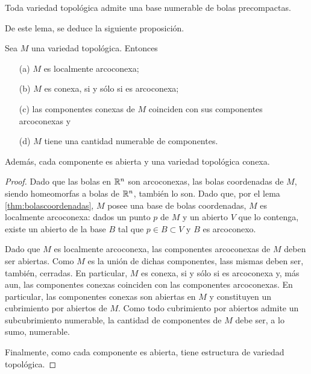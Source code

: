\begin{lemaBolasCoordenadas}
	\label{thm:bolascoordenadas}
	Toda variedad topol\'{o}gica admite una base numerable de bolas
	precompactas.
\end{lemaBolasCoordenadas}

De este lema, se deduce la siguiente proposici\'{o}n.

\begin{propoVariedadesSonLocArco}\label{thm:varssonlocarco}
	Sea $M$ una variedad topol\'{o}gica. Entonces
	\begin{itemize}
		\item[(a)] $M$ es localmente arcoconexa;
		\item[(b)] $M$ es conexa, si y s\'{o}lo si es arcoconexa;
		\item[(c)] las componentes conexas de $M$ coinciden con sus
			componentes arcoconexas y
		\item[(d)] $M$ tiene una cantidad numerable de componentes.
	\end{itemize}
	Adem\'{a}s, cada componente es abierta y una variedad topol\'{o}gica
	conexa.
\end{propoVariedadesSonLocArco}

\begin{proof}
	Dado que las bolas en $\mathbb{R}^{n}$ son arcoconexas, las bolas
	coordenadas de $M$, siendo homeomorfas a bolas de $\mathbb{R}^{n}$,
	tambi\'{e}n lo son. Dado que, por el lema \ref{thm:bolascoordenadas},
	$M$ posee una base de bolas coordenadas, $M$ es localmente arcoconexa:
	dados un punto $p$ de $M$ y un abierto $V$ que lo contenga, existe
	un abierto de la base $B$ tal que $p\in B\subset V$ y $B$ es
	arcoconexo.

	Dado que $M$ es localmente arcoconexa, las componentes arcoconexas
	de $M$ deben ser abiertas. Como $M$ es la uni\'{o}n de dichas
	componentes, lass mismas deben ser, tambi\'{e}n, cerradas. En
	particular, $M$ es conexa, si y s\'{o}lo si es arcoconexa y,
	m\'{a}s aun, las componentes conexas coinciden con las componentes
	arcoconexas. En particular, las componentes conexas son abiertas en
	$M$ y constituyen un cubrimiento por abiertos de $M$. Como todo
	cubrimiento por abiertos admite un subcubrimiento numerable, la
	cantidad de componentes de $M$ debe ser, a lo sumo, numerable.

	Finalmente, como cada componente es abierta, tiene estructura de
	variedad topol\'{o}gica.
\end{proof}


